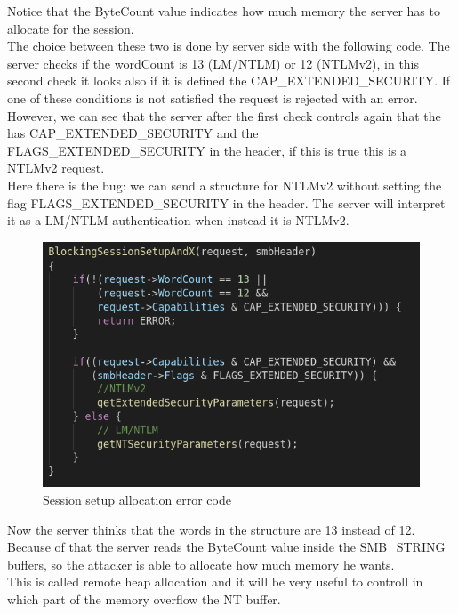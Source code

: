 \noindent Notice that the ByteCount value indicates how much memory the server has to allocate for the session.\\
\noindent The choice between these two is done by server side with the following code. The server checks 
if the wordCount is 13 (LM/NTLM) or 12 (NTLMv2), in this second check it looks also if it is defined the 
CAP\_EXTENDED\_SECURITY. If one of these conditions is not satisfied the request is rejected with an error.
However, we can see that the server after the first check controls again that the has CAP\_EXTENDED\_SECURITY and the
FLAGS\_EXTENDED\_SECURITY in the header, if this is true this is a NTLMv2 request.\\
\noindent Here there is the bug: we can send a structure for NTLMv2 without setting the flag FLAGS\_EXTENDED\_SECURITY in the 
header. The server will interpret it as a LM/NTLM authentication when instead it is NTLMv2.

\begin{figure}[ht!]
  \centering
    \includegraphics[scale=0.35]{images/auth_vuln_code.png}
    \caption{Session setup allocation error code}
\end{figure}

\noindent Now the server thinks that the words in the structure are 13 instead of 12. Because of that the server reads the ByteCount value inside the 
SMB\_STRING buffers, so the attacker is able to allocate how much memory he wants. \\
This is called remote heap allocation and it will be very useful to controll in which part of the memory overflow the NT buffer.